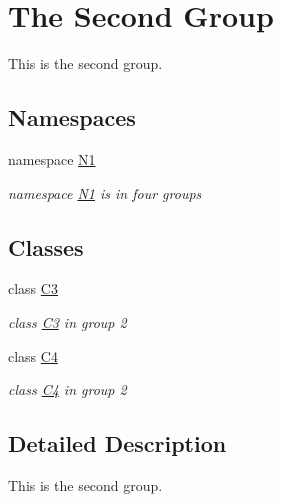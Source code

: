 \hypertarget{group__group2}{\section{The Second Group}
\label{group__group2}
}


This is the second group.  


\subsection*{Namespaces}
\begin{DoxyCompactItemize}
\item 
namespace \hyperlink{namespace_n1}{N1}
\begin{DoxyCompactList}\small\item\em namespace \hyperlink{namespace_n1}{N1} is in four groups \end{DoxyCompactList}\end{DoxyCompactItemize}
\subsection*{Classes}
\begin{DoxyCompactItemize}
\item 
class \hyperlink{class_c3}{C3}
\begin{DoxyCompactList}\small\item\em class \hyperlink{class_c3}{C3} in group 2 \end{DoxyCompactList}\item 
class \hyperlink{class_c4}{C4}
\begin{DoxyCompactList}\small\item\em class \hyperlink{class_c4}{C4} in group 2 \end{DoxyCompactList}\end{DoxyCompactItemize}


\subsection{Detailed Description}
This is the second group. 